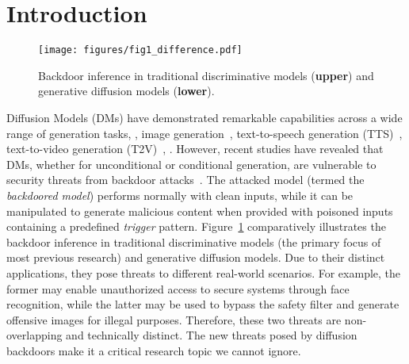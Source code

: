 \section{Introduction}
\label{sec:intro}

\begin{figure}[t]
    \centering
    \texttt{[image: figures/fig1\_difference.pdf]}
    \caption{Backdoor inference in traditional discriminative models (\textbf{upper}) and generative diffusion models (\textbf{lower}).}
    \label{fig:difference}
\end{figure}
Diffusion Models (DMs) have demonstrated remarkable capabilities across a wide range of generation tasks, \eg, image generation~\cite{ho2020denoising}, text-to-speech generation (TTS)~\cite{popov2021grad}, text-to-video generation (T2V)~\cite{ho2022video}, \etc.
However, recent studies have revealed that DMs, whether for unconditional or conditional generation, are vulnerable to security threats from backdoor attacks~\cite{chou2023backdoor,struppek2023rickrolling}. 
The attacked model (termed the \textit{backdoored model}) performs normally with clean inputs, while it can be manipulated to generate malicious content when provided with poisoned inputs containing a predefined \textit{trigger} pattern.  
Figure~\ref{fig:difference} comparatively illustrates the backdoor inference in traditional discriminative models (the primary focus of most previous research) and generative diffusion models. 
Due to their distinct applications, they pose threats to different real-world scenarios. 
For example, the former may enable unauthorized access to secure systems through face recognition, while the latter may be used to bypass the safety filter and generate offensive images for illegal purposes. 
Therefore, these two threats are non-overlapping and technically distinct. 
The new threats posed by diffusion backdoors make it a critical research topic we cannot ignore.



